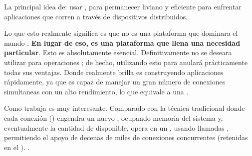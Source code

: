 
La principal idea de\nodejsNAME : usar \nonbloking, \eventdrivenPL {} para permanecer liviano y eficiente para enfrentar aplicaciones \dataintensive \realTimeINT que corren a través de dispositivos distribuidos.


Lo que esto realmente significa es que \nodejsNAME no es una plataforma \panaceaCPT que dominara el mundo \webINT \developmentPC. \textbf{En lugar de eso, es una plataforma que llena una necesidad particular}. Esto es absolutamente esencial. Definitivamente no se deseara utilizar \nodejsNAME para operaciones \cpuIntensivePC; de hecho, utilizando esto para \heavyComputationPC anulará prácticamente todas sus ventajas. Donde \nodejsNAME realmente brilla es construyendo aplicaciones \scalableQA  \networkINT rápidamente, ya que es capaz de manejar un gran número de conexiones simultaneas con un alto rendimiento, lo que equivale a una \highScalabilityDB.

Como trabaja \underTheHoodCPT es muy interesante. Comparado con la técnica tradicional \webServingINT donde cada conexión (\requestINT) engendra un nuevo \threadPL, ocupando memoria \memoryRamPC del sistema y, eventualmente \maxingOutCPT la cantidad de \memoryRamPC disponible, \nodejsNAME opera en un \singleThreadPL, usando llamadas \nonbloking {}, permitiendo el apoyo de decenas de miles de conexiones concurrentes (retenidas en el \eventloopCPT). .


